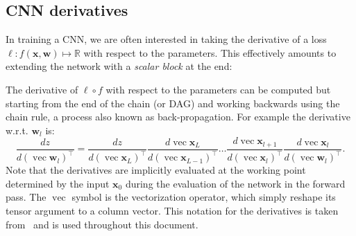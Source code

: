 \documentclass[12pt]{article}
\newcommand{\real}{\mathbb{R}}
\newcommand{\vv}{\operatorname{vec}}
\newcommand{\bx}{\mathbf{x}}
\newcommand{\bw}{\mathbf{w}}
\begin{document}
\subsection{CNN derivatives}\label{s:backward}

In training a CNN, we are often interested in taking the derivative of a loss $\ell : f(\bx,\bw) \mapsto \real$ with respect to the parameters. This effectively amounts to extending the network with a \emph{scalar block} at the end:
\begin{center}
\end{center}
The derivative of $\ell \circ f$ with respect to the parameters can be computed but starting from the end of the chain (or DAG) and working backwards using the chain rule, a process also known as back-propagation. For example the derivative w.r.t. $\bw_l$ is:
\begin{equation}\label{e:chain-rule}
 \frac{dz}{d(\vv\bw_l)^\top}
 =
 \frac{dz}{d(\vv\bx_{L})^\top}
 \frac{d\vv\bx_{L}}{d(\vv\bx_{L-1})^\top}
 \dots
 \frac{d\vv\bx_{l+1}}{d(\vv\bx_{l})^\top}
 \frac{d\vv\bx_{l}}{d(\vv\bw_{l})^\top}.
\end{equation}
Note that the derivatives are implicitly evaluated at the working point determined by the input $\bx_0$ during the evaluation of the network in the forward pass. The $\vv$ symbol is the vectorization operator, which simply reshape its tensor argument to a column vector. This notation for the derivatives is taken from~\cite{kinghorn96integrals} and is used throughout this document.
\end{document}
